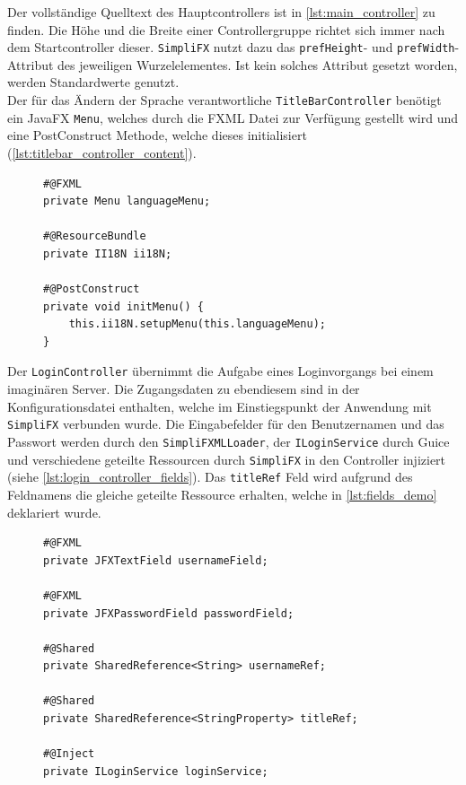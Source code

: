 \noindent Der vollständige Quelltext des Hauptcontrollers ist in \autoref{lst:main_controller} zu finden. Die Höhe und die Breite einer Controllergruppe richtet sich immer nach dem Startcontroller dieser. \texttt{SimpliFX} nutzt dazu das \texttt{prefHeight}- und \texttt{prefWidth}-Attribut des jeweiligen Wurzelelementes. Ist kein solches Attribut gesetzt worden, werden Standardwerte genutzt.\\
Der für das Ändern der Sprache verantwortliche \texttt{TitleBarController} benötigt ein JavaFX \texttt{Menu}, welches durch die FXML Datei zur Verfügung gestellt wird und eine PostConstruct Methode, welche dieses initialisiert (\autoref{lst:titlebar_controller_content}).
\begin{figure}[H]
	\begin{lstlisting}[caption=Demo -- Felder und Methoden im \texttt{TitleBarController}, captionpos=b, label=lst:titlebar_controller_content]
#@FXML
private Menu languageMenu;

#@ResourceBundle
private II18N ii18N;

#@PostConstruct
private void initMenu() {
    this.ii18N.setupMenu(this.languageMenu);
}
	\end{lstlisting}
\end{figure}
\noindent Der \texttt{LoginController} übernimmt die Aufgabe eines Loginvorgangs bei einem imaginären Server. Die Zugangsdaten zu ebendiesem sind in der Konfigurationsdatei enthalten, welche im Einstiegspunkt der Anwendung mit \texttt{SimpliFX} verbunden wurde. Die Eingabefelder für den Benutzernamen und das Passwort werden durch den \texttt{SimpliFXMLLoader}, der \texttt{ILoginService} durch Guice und verschiedene geteilte Ressourcen durch \texttt{SimpliFX} in den Controller injiziert (siehe \autoref{lst:login_controller_fields}). Das \texttt{titleRef} Feld wird aufgrund des Feldnamens die gleiche geteilte Ressource erhalten, welche in \autoref{lst:fields_demo} deklariert wurde.
\begin{figure}[H]
	\begin{lstlisting}[caption=Demo -- Injizierte Felder des \texttt{LoginController}s, captionpos=b, label=lst:login_controller_fields]
#@FXML
private JFXTextField usernameField;

#@FXML
private JFXPasswordField passwordField;

#@Shared
private SharedReference<String> usernameRef;

#@Shared
private SharedReference<StringProperty> titleRef;

#@Inject
private ILoginService loginService;
	\end{lstlisting}
\end{figure}
